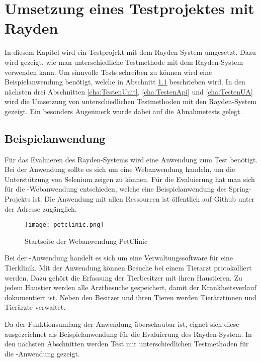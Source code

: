 \chapter{Umsetzung eines Testprojektes mit Rayden}
\label{cha:Testen}

In diesem Kapitel wird ein Testprojekt mit dem Rayden-System umgesetzt. Dazu wird gezeigt, wie man unterschiedliche Testmethode mit dem Rayden-System verwenden kann. Um sinnvolle Tests schreiben zu können wird eine Beispielanwendung benötigt, welche in Abschnitt \ref{cha:demoapp} beschrieben wird. In den nächsten drei Abschnitten \ref{cha:TestenUnit}, \ref{cha:TestenApi} und \ref{cha:TestenUA} wird die Umsetzung von unterschiedlichen Testmethoden mit den Rayden-System gezeigt. Ein besonders Augenmerk wurde dabei auf die Abnahmetests gelegt.


\section{Beispielanwendung}
\label{cha:demoapp}

Für das Evaluieren des Rayden-Systems wird eine Anwendung zum Test benötigt. Bei der Anwendung sollte es sich um eine Webanwendung handeln, um die Unterstützung von Selenium zeigen zu können. Für die Evaluierung hat man sich für die -Webanwendung entschieden, welche eine Beispielanwendung des Spring-Projekts ist. Die Anwendung mit allen Ressourcen ist öffentlich auf Github unter der Adresse  zugänglich.

\begin{figure}
\centering
\texttt{[image: petclinic.png]}
\caption{Startseite der Webanwendung PetClinic}
\label{fig:petClinicPage}
\end{figure}

\SuperPar
Bei der -Anwendung handelt es sich um eine Verwaltungssoftware für eine Tierklinik. Mit der Anwendung können Besuche bei einem Tierarzt protokolliert werden. Dazu gehört die Erfassung der Tierbesitzer mit ihren Haustieren. Zu jedem Haustier werden alle Arztbesuche gespeichert, damit der Krankheitsverlauf dokumentiert ist. Neben den Besitzer und ihren Tieren werden Tierärztinnen und Tierärzte verwaltet. 

\SuperPar
Da der Funktionsumfang der Anwendung überschaubar ist, eignet sich diese ausgezeichnet als Beispielanwendung für die Evaluierung des Rayden-System. In den nächsten Abschnitten werden Test mit unterschiedlichen Testmethoden für die -Anwendung gezeigt.

